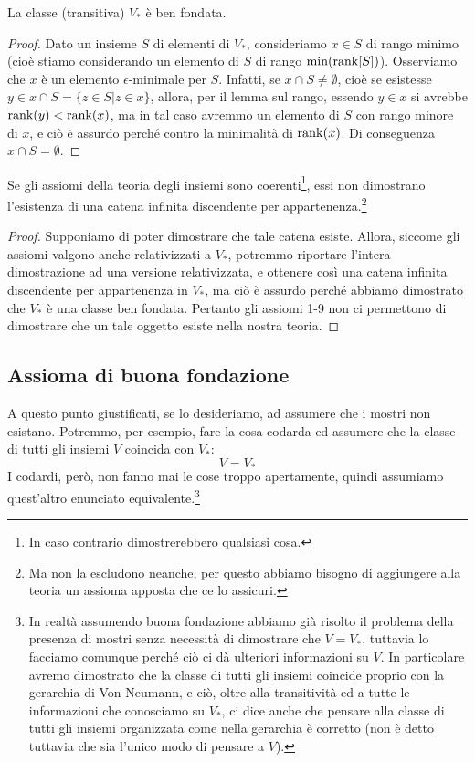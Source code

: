 \begin{proposition}
	La classe (transitiva) $V_*$ è ben fondata.
\end{proposition}

\begin{proof}
	Dato un insieme $S$ di elementi di $V_*$, consideriamo $x \in S$ di rango minimo (cioè stiamo considerando un elemento di $S$ di rango $\min(\operatorname{rank}[S])$). Osserviamo che $x$ è un elemento $\epsilon$-minimale per $S$.
	Infatti, se $x \cap S \ne \emptyset$, cioè se esistesse $y \in x \cap S = \{z \in S | z \in x\}$, allora, per il lemma sul rango, essendo $y \in x$ si avrebbe $\operatorname{rank}(y) < \operatorname{rank}(x)$, ma in tal caso avremmo un elemento di $S$ con rango minore di $x$, e ciò è assurdo perché contro la minimalità di $\operatorname{rank}(x)$.
	Di conseguenza $x \cap S = \emptyset$.
\end{proof}

\begin{theorem}
	Se gli assiomi della teoria degli insiemi sono coerenti\footnote{In caso contrario dimostrerebbero qualsiasi cosa.}, essi non dimostrano l'esistenza di una catena infinita discendente per appartenenza.\footnote{Ma non la escludono neanche, per questo abbiamo bisogno di aggiungere alla teoria un assioma apposta che ce lo assicuri.}
\end{theorem}

\begin{proof}
	Supponiamo di poter dimostrare che tale catena esiste. Allora, siccome gli assiomi valgono anche relativizzati a $V_*$, potremmo riportare l'intera dimostrazione ad una versione relativizzata, e ottenere così una catena infinita discendente per appartenenza in $V_*$,
	ma ciò è assurdo perché abbiamo dimostrato che $V_*$ è una classe ben fondata. Pertanto gli assiomi 1-9 non ci permettono di dimostrare che un tale oggetto esiste nella nostra teoria.
\end{proof}

\subsection{Assioma di buona fondazione}
A questo punto giustificati, se lo desideriamo, ad assumere che i mostri non esistano. Potremmo, per esempio, fare la cosa codarda ed assumere che la classe di tutti gli insiemi $V$ coincida con $V_*$:
\[ V = V_*
	\]
I codardi, però, non fanno mai le cose troppo apertamente, quindi assumiamo quest'altro enunciato equivalente.\footnote{In realtà assumendo buona fondazione abbiamo già risolto il problema della presenza di mostri senza necessità di dimostrare che $V = V_*$, tuttavia lo facciamo comunque perché ciò ci dà ulteriori informazioni su $V$.
In particolare avremo dimostrato che la classe di tutti gli insiemi coincide proprio con la gerarchia di Von Neumann, e ciò, oltre alla transitività ed a tutte le informazioni che conosciamo su $V_*$, ci dice anche che pensare alla classe di tutti gli insiemi organizzata come nella gerarchia è corretto (non è detto tuttavia che sia l'unico modo di pensare a $V$).}

